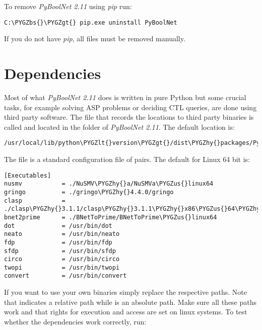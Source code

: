 \documentclass[letterpaper,10pt,english]{sphinxmanual}
\def\PYGZbs{\char`\\}
\def\PYGZus{\char`\_}
\def\PYGZlt{\char`\<}
\def\PYGZgt{\char`\>}
\def\PYGZhy{\char`\-}
\begin{document}
To remove \emph{PyBoolNet 2.11} using \emph{pip} run:

\begin{Verbatim}[commandchars=\\\{\}]
C:\PYGZbs{}\PYGZgt{} pip.exe uninstall PyBoolNet
\end{Verbatim}

If you do not have \emph{pip}, all files must be removed manually.


\section{Dependencies}
\label{Installation:dependencies}
Most of what \emph{PyBoolNet 2.11} does is written in pure Python but some crucial tasks, for example solving ASP problems or deciding CTL queries, are done using third party software.
The file that records the locations to third party binaries is called  and located in the folder  of \emph{PyBoolNet 2.11}.
The default location is:

\begin{Verbatim}[commandchars=\\\{\}]
/usr/local/lib/python\PYGZlt{}version\PYGZgt{}/dist\PYGZhy{}packages/PyBoolNet/Dependencies/settings.cfg
\end{Verbatim}

The file is a standard configuration file of  pairs. The default for Linux 64 bit is:

\begin{Verbatim}[commandchars=\\\{\}]
[Executables]
nusmv           = ./NuSMV\PYGZhy{}a/NuSMVa\PYGZus{}linux64
gringo          = ./gringo\PYGZhy{}4.4.0/gringo
clasp           = ./clasp\PYGZhy{}3.1.1/clasp\PYGZhy{}3.1.1\PYGZhy{}x86\PYGZus{}64\PYGZhy{}linux
bnet2prime      = ./BNetToPrime/BNetToPrime\PYGZus{}linux64
dot             = /usr/bin/dot
neato           = /usr/bin/neato
fdp             = /usr/bin/fdp
sfdp            = /usr/bin/sfdp
circo           = /usr/bin/circo
twopi           = /usr/bin/twopi
convert         = /usr/bin/convert
\end{Verbatim}

If you want to use your own binaries simply replace the respective paths. Note that  indicates a relative path while \code{/} is an absolute path.
Make sure all these paths work and that rights for execution and access are set on linux systems.
To test whether the dependencies work correctly, run:
\end{document}
